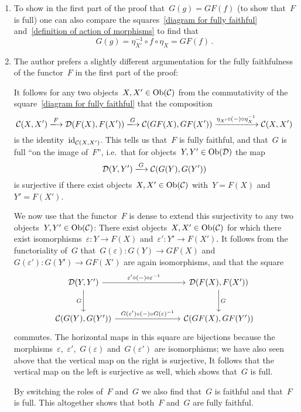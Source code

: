\begin{remark*}
  \leavevmode
  \begin{enumerate}
    \item
      To show in the first part of the proof that~$G(g) = GF(f)$ (to show that~$F$ is full) one can also compare the squares~\eqref{diagram for fully faithful} and~\eqref{definition of action of morphisms} to find that
      \[
          G(g)
        = \eta_{X'}^{-1} \circ f \circ \eta_X
        = GF(f) \,.
      \]
    \item
      The author prefers a slightly different argumentation for the fully faithfulness of the functor~$F$ in the first part of the proof:
      
      It follows for any two objects~$X, X' \in \operatorname{Ob}(\mathcal{C})$ from the commutativity of the square~\eqref{diagram for fully faithful} that the composition
      \[
          \Ccat(X, X')
        \xlongto{F}
          \Dcat(F(X), F(X'))
        \xlongto{G}
          \Ccat(GF(X), GF(X'))
        \xlongto{\eta_{X'} \circ (-) \circ \eta^{-1}_X}
          \Ccat(X, X')
      \]
      is the identity~$\operatorname{id}_{\mathcal{C}(X,X')}$.
      This tells us that~$F$ is fully faithful, and that~$G$ is full \enquote{on the image of~$F$}, i.e.\ that for objects~$Y, Y' \in \operatorname{Ob}(\mathcal{D})$ the map
      \[
          \Dcat(Y, Y')
        \xlongto{G}
          \Ccat(G(Y), G(Y'))
      \]
      is surjective if there exist objects~$X, X' \in \operatorname{Ob}(\mathcal{C})$ with~$Y = F(X)$ and~$Y' = F(X')$.
      
      We now use that the functor~$F$ is dense to extend this surjectivity to any two objects~$Y, Y' \in \operatorname{Ob}(\mathcal{C})$:
      There exist objects~$X, X' \in \operatorname{Ob}(\mathcal{C})$ for which there exist isomorphisms~$\varepsilon \colon Y \to F(X)$ and~$\varepsilon' \colon Y' \to F(X')$.
      It follows from the functoriality of~$G$ that~$G(\varepsilon) \colon G(Y) \to GF(X)$ and~$G(\varepsilon') \colon G(Y') \to GF(X')$ are again isomorphisms, and that the square
      \[
        \begin{tikzcd}[row sep = large, column sep = 8em]
            \Dcat(Y, Y')
            \arrow{r}[above]{\varepsilon' \circ (-) \circ \varepsilon^{-1}}
            \arrow{d}[left]{G}
          & \Dcat(F(X), F(X'))
            \arrow{d}[right]{G}
          \\
            \Ccat(G(Y), G(Y'))
            \arrow{r}[above]{G(\varepsilon') \circ (-) \circ G(\varepsilon)^{-1}}
          & \Ccat(GF(X), GF(Y'))
        \end{tikzcd}
      \]
      commutes.
      The horizontal maps in this square are bijections because the morphisms~$\varepsilon$,~$\varepsilon'$,~$G(\varepsilon)$ and~$G(\varepsilon')$ are isomorphisms;
      we have also seen above that the vertical map on the right is surjective, 
      It follows that the vertical map on the left is surjective as well, which shows that~$G$ is full.
      
      By switching the roles of~$F$ and~$G$ we also find that~$G$ is faithful and that~$F$ is full.
      This altogether shows that both~$F$ and~$G$ are fully faithful.
  \end{enumerate}
\end{remark*}




